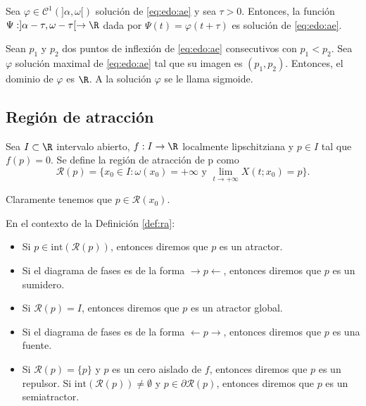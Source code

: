\documentclass{article}
\begin{document}
\begin{lemma}
  Sea $\varphi \in \mathcal{C}^1(]\alpha, \omega[)$ solución de \eqref{eq:edo:ae} y sea $\tau >
  0$. Entonces, la función $\Psi: ]\alpha-\tau, \omega-\tau[ \to \R$ dada por
  $\Psi(t) = \varphi(t+\tau)$ es solución de \eqref{eq:edo:ae}.
\end{lemma}

\begin{cor}
  Sean $p_1$ y $p_2$ dos puntos de inflexión de \eqref{eq:edo:ae} consecutivos con $p_1 < p_2$. Sea $\varphi$ solución maximal de \eqref{eq:edo:ae} tal que su imagen es $(p_1, p_2)$. Entonces, el dominio de $\varphi$ es $\R$. A la solución $\varphi$ se le llama sigmoide. 
\end{cor}

\begin{definition}
\end{definition}

\subsection{Región de atracción}

\begin{definition}
  \label{def:ra}
  Sea $I \subset \R$ intervalo abierto, $f: I \to \R$ localmente lipschitziana y $p \in I$ tal que
  $f(p) = 0$. Se define la región de atracción de p como
  \[ \mathcal{R}(p) = \{x_0\in I: \omega(x_0) = +\infty \text{ y } \lim_{t \to +\infty} X(t;x_0) =
    p\}. \]
\end{definition}

Claramente tenemos que $p \in \mathcal{R}(x_0)$.

\begin{definition}
  \label{def:atractor}
  En el contexto de la Definición \ref{def:ra}:
  \begin{itemize}
  \item Si $p \in \mathrm{int}(\mathcal{R}(p))$, entonces diremos que $p$ es un atractor.
  \item Si el diagrama de fases es de la forma $\rightarrow p \leftarrow$, entonces diremos que $p$
    es un sumidero.
  \item Si $\mathcal{R}(p) = I$, entonces diremos que $p$ es un atractor global.
  \item Si el diagrama de fases es de la forma $\leftarrow p \rightarrow$, entonces diremos que $p$
    es una fuente.
  \item Si $\mathcal{R}(p) = \{p\}$ y $p$ es un cero aislado de $f$, entonces diremos que $p$ es un
    repulsor.  Si $\mathrm{int}(\mathcal{R}(p)) \ne \emptyset$ y $p \in \partial \mathcal{R}(p)$,
    entonces diremos que $p$ es un semiatractor.
  \end{itemize}
\end{definition}
\end{document}
